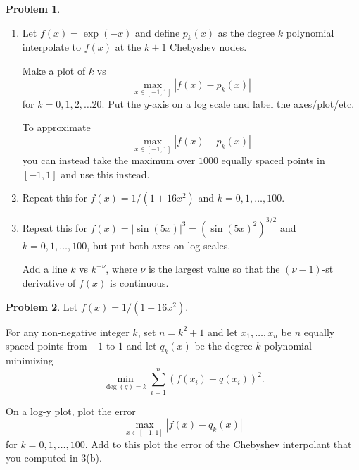 \documentclass[12pt]{article}
\theoremstyle{definition}
\newtheorem{problem}{Problem}
\begin{document}
\begin{problem}
    \begin{enumerate}
        \item 
    Let $f(x) = \exp(-x)$ and define $p_k(x)$ as the degree $k$ polynomial interpolate to $f(x)$ at the $k+1$ Chebyshev nodes. 

    Make a plot of $k$ vs 
    \[
        \max_{x\in[-1,1]} |f(x) - p_k(x)|
    \]
    for $k=0,1,2,\ldots20$. Put the $y$-axis on a log scale and label the axes/plot/etc.

    To approximate \[
        \max_{x\in[-1,1]} |f(x) - p_k(x)|
    \]
    you can instead take the maximum over $1000$ equally spaced points in $[-1,1]$ and use this instead. 

\item Repeat this for $f(x) = 1/(1+16x^2)$ and $k=0,1,\ldots, 100$.

\item Repeat this for $f(x) = |\sin(5x)|^3 = (\sin(5x)^2)^{3/2}$ and $k=0,1,\ldots,100$, but put both axes on log-scales.

    Add a line $k$ vs $k^{-\nu}$, where $\nu$ is the largest value so that the $(\nu-1)$-st derivative of $f(x)$ is continuous.
\end{enumerate}

\end{problem}

\begin{problem}
    Let $f(x) = 1/(1+16x^2)$.

    For any non-negative integer $k$, set $n=k^2+1$ and let $x_1 ,\ldots, x_n$ be $n$ equally spaced points from $-1$ to $1$ and let $q_{k}(x)$ be the degree $k$ polynomial minimizing
    \[
        \min_{\deg(q) = k} \sum_{i=1}^{n} ( f(x_i) - q(x_i) )^2.
    \]

    On a log-y plot, plot the error
    \[
        \max_{x\in[-1,1]} |f(x) - q_{k}(x)|
    \]
    for $k=0,1,\ldots, 100$.
    Add to this plot the error of the Chebyshev interpolant that you computed in 3(b).



\end{problem}
\end{document}

